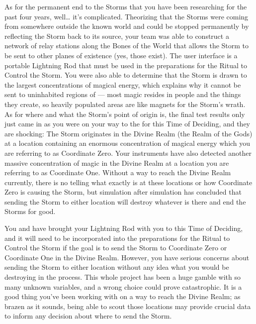 \documentclass[char]{GL2020}
\begin{document}
As for the permanent end to the Storms that you have been researching for the past four years, well\ldots{} it's complicated. Theorizing that the Storms were coming from somewhere outside the known world and could be stopped permanently by reflecting the Storm back to its source, your team was able to construct a network of relay stations along the Bones of the World that allows the Storm to be sent to other planes of existence (yes, those exist). The user interface is a portable Lightning Rod that must be used in the preparations for the Ritual to Control the Storm. You were also able to determine that the Storm is drawn to the largest concentrations of magical energy, which explains why it cannot be sent to uninhabited regions of \pEarth{} — most magic resides in people and the things they create, so heavily populated areas are like magnets for the Storm’s wrath. As for where and what the Storm’s point of origin is, the final test results only just came in as you were on your way to the \pSchool{} for this Time of Deciding, and they are shocking: The Storm originates in the Divine Realm (the Realm of the Gods) at a location containing an enormous concentration of magical energy which you are referring to as Coordinate Zero. Your instruments have also detected another massive concentration of magic in the Divine Realm at a location you are referring to as Coordinate One. Without a way to reach the Divine Realm currently, there is no telling what exactly is at these locations or how Coordinate Zero is causing the Storm, but simulation after simulation has concluded that sending the Storm to either location will destroy whatever is there and end the Storms for good. 

You and \cHeadScientist{} have brought your Lightning Rod with you to this Time of Deciding, and it will need to be incorporated into the preparations for the Ritual to Control the Storm if the goal is to send the Storm to Coordinate Zero or Coordinate One in the Divine Realm. However, you have serious concerns about sending the Storm to either location without any idea what you would be destroying in the process. This whole project has been a huge gamble with so many unknown variables, and a wrong choice could prove catastrophic. It is a good thing you’ve been working with \cCurse{} on a way to reach the Divine Realm; as brazen as it sounds, being able to scout those locations may provide crucial data to inform any decision about where to send the Storm. 
\end{document}
